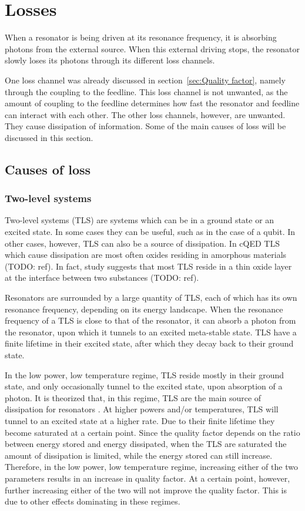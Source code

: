 \documentclass[12pt]{report}
\begin{document}
\section{Losses}

When a resonator is being driven at its resonance frequency, it is absorbing photons from the external source. When this external driving stops, the resonator slowly loses its photons through its different loss channels.

One loss channel was already discussed in section~\ref{sec:Quality factor}, namely through the coupling to the feedline. This loss channel is not unwanted, as the amount of coupling to the feedline determines how fast the resonator and feedline can interact with each other. The other loss channels, however, are unwanted. They cause dissipation of information. Some of the main causes of loss will be discussed in this section.


\subsection{Causes of loss}

\subsubsection{Two-level systems}
\label{sec:TLS}
Two-level systems (TLS) are systems which can be in a ground state or an excited state. In some cases they can be useful, such as in the case of a qubit. In other cases, however, TLS can also be a source of dissipation. In cQED TLS which cause dissipation are most often oxides residing in amorphous materials (TODO: ref). In fact, study suggests that most TLS reside in a thin oxide layer at the interface between two substances (TODO: ref).

Resonators are surrounded by a large quantity of TLS, each of which has its own resonance frequency, depending on its energy landscape. When the resonance frequency of a TLS is close to that of the resonator, it can absorb a photon from the resonator, upon which it tunnels to an excited meta-stable state. TLS have a finite lifetime in their excited state, after which they decay back to their ground state.

In the low power, low temperature regime, TLS reside mostly in their ground state, and only occasionally tunnel to the excited state, upon absorption of a photon. It is theorized that, in this regime, TLS are the main source of dissipation for resonators \cite{gao2008experimental}. At higher powers and/or temperatures, TLS will tunnel to an excited state at a higher rate. Due to their finite lifetime they become saturated at a certain point. Since the quality factor depends on the ratio between energy stored and energy dissipated, when the TLS are saturated the amount of dissipation is limited, while the energy stored can still increase. Therefore, in the low power, low temperature regime, increasing either of the two parameters results in an increase in quality factor. At a certain point, however, further increasing either of the two will not improve the quality factor. This is due to other effects dominating in these regimes.
\end{document}

